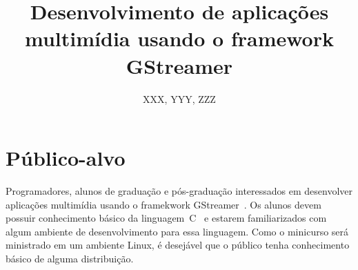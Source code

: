 \documentclass{SBCbookchapter}
\title{Desenvolvimento de aplicações multimídia usando o framework GStreamer}
\author{XXX, YYY, ZZZ}
\begin{document}
\maketitle
\begin{abstract}
\begin{otherlanguage}{english}
\end{otherlanguage}
\end{abstract}

\begin{resumo}
\end{resumo}

\section{Público-alvo}
Programadores, alunos de graduação e pós-graduação interessados em
desenvolver aplicações multimídia usando o framekwork GStreamer~\cite{?}.  
Os alunos devem possuir conhecimento básico da linguagem~C~\cite{?} e estarem
familiarizados com algum ambiente de desenvolvimento para essa linguagem.
Como o minicurso será ministrado em um ambiente Linux, é desejável
que o público tenha conhecimento básico de alguma distribuição.  


\end{document}
